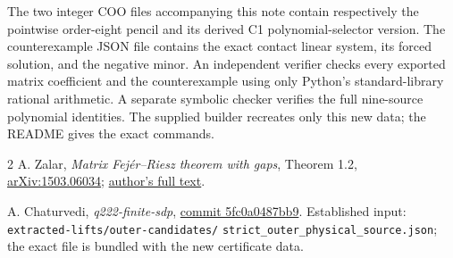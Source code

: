 \documentclass[11pt]{article}
\begin{document}
The two integer COO files accompanying this note contain respectively the
pointwise order-eight pencil and its derived C1 polynomial-selector version.
The counterexample JSON file contains the exact contact linear system, its
forced solution, and the negative minor.  An independent verifier checks every
exported matrix coefficient and the counterexample using only Python's
standard-library rational arithmetic.  A separate symbolic checker verifies
the full nine-source polynomial identities. The supplied builder recreates
only this new data; the README gives the exact commands.

\begin{thebibliography}{2}
 A. Zalar, \emph{Matrix Fej\'er--Riesz theorem with gaps},
Theorem 1.2, \href{https://arxiv.org/abs/1503.06034}{arXiv:1503.06034};
\href{https://zalara.github.io/Papers/MatrixFejerRieszArxivOriginal.pdf}{author's full text}.
 \raggedright A. Chaturvedi, \emph{q222-finite-sdp},
\href{https://github.com/anubhav70747/q222-finite-sdp/tree/5fc0a0487bb94d7bdfa9929edb5f4f6f3ff50240}{commit 5fc0a0487bb9}.
Established input: \texttt{extracted-lifts/outer-candidates/}
\texttt{strict\_outer\_physical\_source.json}; the exact file is bundled
with the new certificate data.
\end{thebibliography}
\end{document}
